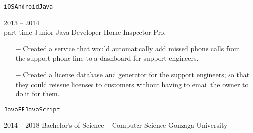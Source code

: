 \documentclass[9pt]{developercv} %
\begin{document}
\begin{entrylist}
{\begin{itemize}
			\end{itemize}
			\texttt{iOS}\slashsep\texttt{Android}\slashsep\texttt{Java}}
	\entry
		{2013 -- 2014\\\footnotesize{part time}}
		{Junior Java Developer}
		{Home Inspector Pro.}
		{
			\vspace*{-\baselineskip}
			\begin{itemize}
				\item[$-$] Created a service that would automatically add missed phone calls from the support phone line to a dashboard for support engineers.
				\item[$-$] Created a license database and generator for the support engineers; so that they could reissue licenses to customers without having to email the owner to do it for them.
			\end{itemize}
			\texttt{JavaEE}\slashsep\texttt{JavaScript}}
\end{entrylist}

\newpage
{}

\begin{entrylist}
	\entry
		{2014 -- 2018}
		{Bachelor's of Science \textnormal{-- Computer Science}}
		{Gonzaga University}
		{}
\end{entrylist}



\end{document}
